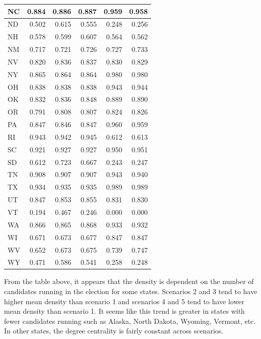 \documentclass[]{article}
\begin{document}
\begin{table}[!h]
\begin{tabular}{l|r|r|r|r|r}
\hline
\rowcolor{gray!6}  NC & 0.884 & 0.886 & 0.887 & 0.959 & 0.958\\
\hline
ND & 0.502 & 0.615 & 0.555 & 0.248 & 0.256\\
\hline
\rowcolor{gray!6}  NH & 0.578 & 0.599 & 0.607 & 0.564 & 0.562\\
\hline
NM & 0.717 & 0.721 & 0.726 & 0.727 & 0.733\\
\hline
\rowcolor{gray!6}  NV & 0.820 & 0.836 & 0.837 & 0.830 & 0.829\\
\hline
NY & 0.865 & 0.864 & 0.864 & 0.980 & 0.980\\
\hline
\rowcolor{gray!6}  OH & 0.838 & 0.838 & 0.838 & 0.943 & 0.944\\
\hline
OK & 0.832 & 0.836 & 0.848 & 0.889 & 0.890\\
\hline
\rowcolor{gray!6}  OR & 0.791 & 0.808 & 0.807 & 0.824 & 0.826\\
\hline
PA & 0.847 & 0.846 & 0.847 & 0.960 & 0.959\\
\hline
\rowcolor{gray!6}  RI & 0.943 & 0.942 & 0.945 & 0.612 & 0.613\\
\hline
SC & 0.921 & 0.927 & 0.927 & 0.950 & 0.951\\
\hline
\rowcolor{gray!6}  SD & 0.612 & 0.723 & 0.667 & 0.243 & 0.247\\
\hline
TN & 0.908 & 0.907 & 0.907 & 0.943 & 0.940\\
\hline
\rowcolor{gray!6}  TX & 0.934 & 0.935 & 0.935 & 0.989 & 0.989\\
\hline
UT & 0.847 & 0.853 & 0.855 & 0.831 & 0.830\\
\hline
\rowcolor{gray!6}  VT & 0.194 & 0.467 & 0.246 & 0.000 & 0.000\\
\hline
WA & 0.866 & 0.865 & 0.868 & 0.933 & 0.932\\
\hline
\rowcolor{gray!6}  WI & 0.671 & 0.673 & 0.677 & 0.847 & 0.847\\
\hline
WV & 0.652 & 0.673 & 0.675 & 0.739 & 0.747\\
\hline
\rowcolor{gray!6}  WY & 0.471 & 0.586 & 0.541 & 0.258 & 0.248\\
\hline
\end{tabular}
\end{table}

From the table above, it appears that the density is dependent on the
number of candidates running in the election for some states. Scenarios
2 and 3 tend to have higher mean density than scenario 1 and scenarios 4
and 5 tend to have lower mean density than scenario 1. It seems like
this trend is greater in states with fewer candidates running such as
Alaska, North Dakota, Wyoming, Vermont, etc. In other states, the degree
centrality is fairly constant across scenarios.
\end{document}
